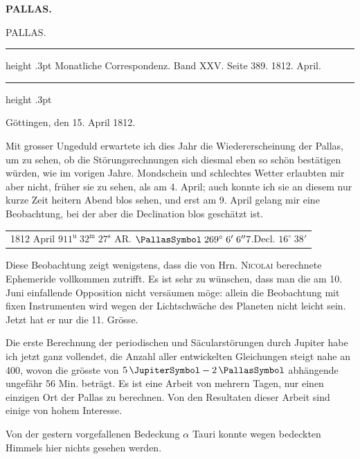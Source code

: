 \clearpage
\thispagestyle{empty}
\noindent{}%
\makebox[12mm][l]{}%
\parbox[t]{\dimexpr\linewidth-24mm\relax}{\centering\footnotesize\bfseries PALLAS.\par}%
\par\nobreak\medskip
\begin{center}\large PALLAS.\end{center}
\begin{center}
\parbox{.76\linewidth}{%
\centering\fontsize{8.2}{10.2}\selectfont
\hrule height .3pt\relax\vspace{2.5pt}
Monatliche Correspondenz. Band XXV. Seite 389. 1812. April.\par
\vspace{2.5pt}\hrule height .3pt\relax
}
\end{center}

\begin{flushright}Göttingen, den 15. April 1812.\end{flushright}
\par\indent Mit grosser Ungeduld erwartete ich dies Jahr die Wiedererscheinung der Pallas, um zu sehen, ob die Störungsrechnungen sich diesmal eben so schön bestätigen würden, wie im vorigen Jahre. Mondschein und schlechtes Wetter erlaubten mir aber nicht, früher sie zu sehen, als am 4. April; auch konnte ich sie an diesem nur kurze Zeit heitern Abend blos sehen, und erst am 9. April gelang mir eine Beobachtung, bei der aber die Declination blos geschätzt ist.

\begin{center}\fontsize{10}{12}\selectfont\setlength{\tabcolsep}{0pt}\renewcommand{\arraystretch}{1.15}\begin{tabular}{l}
1812 April 9\quad $11^{\mathrm u}\;32^{\mathrm m}\;27^{\mathrm s}$ AR. $\PallasSymbol\;269^\circ\;6'\;6''7$.\quad Decl. $16^\circ\;38'$
\end{tabular}\end{center}

\par\indent Diese Beobachtung zeigt wenigstens, dass die von Hrn. \textsc{Nicolai} berechnete Ephemeride vollkommen zutrifft. Es ist sehr zu wünschen, dass man die am 10. Juni einfallende Opposition nicht versäumen möge: allein die Beobachtung mit fixen Instrumenten wird wegen der Lichtschwäche des Planeten nicht leicht sein. Jetzt hat er nur die 11. Grösse.

\par\indent Die erste Berechnung der periodischen und Säcularstörungen durch Jupiter habe ich jetzt ganz vollendet, die Anzahl aller entwickelten Gleichungen steigt nahe an 400, wovon die grösste von $5\,\JupiterSymbol-2\,\PallasSymbol$ abhängende ungefähr 56 Min. beträgt. Es ist eine Arbeit von mehrern Tagen, nur einen einzigen Ort der Pallas zu berechnen. Von den Resultaten dieser Arbeit sind einige von hohem Interesse.

\par\indent Von der gestern vorgefallenen Bedeckung $\alpha$ Tauri konnte wegen bedeckten Himmels hier nichts gesehen werden.
